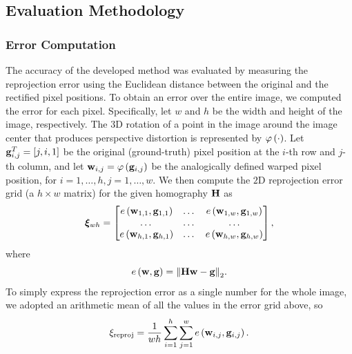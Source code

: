 \subsection{Evaluation Methodology}
\label{ssec:evaluation_methodology}

\subsubsection{Error Computation}
\label{sssec:error_computation}

\def\warpedpix{\vect{w}}
\def\origpix{\vect{g}}

The accuracy of the developed method was evaluated by measuring the reprojection error using the Euclidean distance between the original and the rectified pixel positions. To obtain an error over the entire image, we computed the error for each pixel. Specifically, let $w$ and $h$ be the width and height of the image, respectively. The $3$D rotation of a point in the image around the image center that produces perspective distortion is represented by ${\varphi} \left( \cdot \right)$. Let $\subsup{\origpix}{i,j}{T} = \sbrackets{j, i, 1}$ be the original (ground-truth) pixel position at the $i$-th row and $j$-th column, and let $\warpedpix_{i, j} = \func{\varphi}{\origpix_{i, j}}$ be the analogically defined warped pixel position, for $i = 1, \dots, h, j = 1, \dots, w$. We then compute the $2$D reprojection error grid (a $h \times w$ matrix) for the given homography $\mathbf{H}$ as
\begin{equation}
    \label{eq:reprojection_error_grid}
    \boldsymbol{\xi}_{wh} =
    \begin{bmatrix}
        \func{e}{\warpedpix_{1, 1}, \origpix_{1, 1}} & \dots & \func{e}{\warpedpix_{1, w}, \origpix_{1, w}} \\
        \dots                                        & \dots & \dots                                        \\
        \func{e}{\warpedpix_{h, 1}, \origpix_{h, 1}} & \dots & \func{e}{\warpedpix_{h, w}, \origpix_{h, w}}
    \end{bmatrix},
\end{equation}
where
\begin{equation}
    \func{e}{\warpedpix, \origpix} = \euclnorm{\H \warpedpix - \origpix}.
\end{equation}
To simply express the reprojection error as a single number for the whole image, we adopted an arithmetic mean of all the values in the error grid above, so
\begin{equation}
    \label{eq:ReprojectionErrorSingle}
    \xi_{\text{reproj}} =
    \frac{1}{wh}
    \sum_{i = 1}^{h}
    \sum_{j = 1}^{w}
    \func{e}{\warpedpix_{i, j}, \origpix_{i, j}}.
\end{equation}


